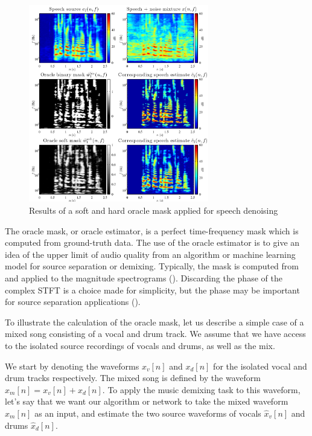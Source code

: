 \documentclass[report.tex]{subfiles}
\begin{document}
\begin{figure}[ht]
	\centering
	\includegraphics[width=0.7\textwidth]{./images-mss/maskdemo.png}
	\caption{Results of a soft and hard oracle mask applied for speech denoising}
	\label{fig:masks}
\end{figure}

The oracle mask, or oracle estimator, is a perfect time-frequency mask which is computed from ground-truth data. The use of the oracle estimator is to give an idea of the upper limit of audio quality from an algorithm or machine learning model for source separation or demixing. Typically, the mask is computed from and applied to the magnitude spectrograms (\cite{fitzgerald1, fitzgerald2, driedger, umx, plumbley1, plumbley2}). Discarding the phase of the complex STFT is a choice made for simplicity, but the phase may be important for source separation applications (\cite{ditchphase}).

To illustrate the calculation of the oracle mask, let us describe a simple case of a mixed song consisting of a vocal and drum track. We assume that we have access to the isolated source recordings of vocals and drums, as well as the mix.

We start by denoting the waveforms $x_{v}[n]$ and $x_{d}[n]$ for the isolated vocal and drum tracks respectively. The mixed song is defined by the waveform $x_{m}[n] = x_{v}[n] + x_{d}[n]$. To apply the music demixing task to this waveform, let's say that we want our algorithm or network to take the mixed waveform $x_{m}[n]$ as an input, and estimate the two source waveforms of vocals $\hat{x}_{v}[n]$ and drums $\hat{x}_{d}[n]$.
\end{document}

